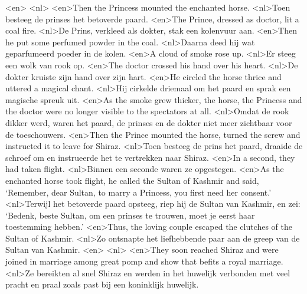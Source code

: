 <en>
<nl>
<en>Then the Princess mounted the enchanted horse.
<nl>Toen besteeg de prinses het betoverde paard.
<en>The Prince, dressed as doctor, lit a coal fire.
<nl>De Prins, verkleed als dokter, stak een kolenvuur aan.
<en>Then he put some perfumed powder in the coal.
<nl>Daarna deed hij wat geparfumeerd poeder in de kolen.
<en>A cloud of smoke rose up.
<nl>Er steeg een wolk van rook op.
<en>The doctor crossed his hand over his heart.
<nl>De dokter kruiste zijn hand over zijn hart.
<en>He circled the horse thrice and uttered a magical chant.
<nl>Hij cirkelde driemaal om het paard en  sprak een magische spreuk uit.
<en>As the smoke grew thicker, the horse, the Princess and the doctor were no longer visible to the spectators at all.
<nl>Omdat de rook dikker werd, waren het paard, de prinses en de dokter niet meer zichtbaar voor de toeschouwers.
<en>Then the Prince mounted the horse, turned the screw and instructed it to leave for Shiraz.
<nl>Toen besteeg de prins het paard, draaide de schroef om en instrueerde het te vertrekken  naar Shiraz.
<en>In a second, they had taken flight.
<nl>Binnen een seconde waren ze opgestegen.
<en>As the enchanted horse took flight, he called the Sultan of Kashmir and said, `Remember, dear Sultan, to marry a Princess, you first need her consent.'
<nl>Terwijl het betoverde paard opsteeg, riep hij de Sultan van Kashmir, en zei: `Bedenk, beste Sultan, om een prinses te trouwen, moet je eerst haar toestemming hebben.'
<en>Thus, the loving couple escaped the clutches of the Sultan of Kashmir.
<nl>Zo ontsnapte het liefhebbende paar aan de greep van de Sultan van Kashmir.
<en>
<nl>
<en>They soon reached Shiraz and were joined in marriage among great pomp and show that befits a royal marriage.
<nl>Ze bereikten al snel Shiraz en werden in het huwelijk verbonden met veel pracht en praal zoals past bij  een koninklijk huwelijk.

